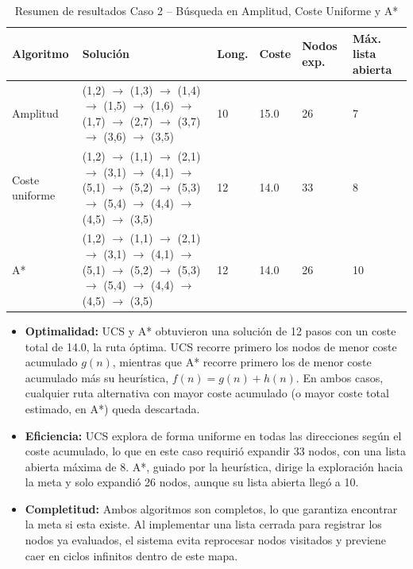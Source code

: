 \documentclass[12pt,a4paper]{article}
\begin{document}
\begin{table}[H]
\centering
\small
\begin{tabularx}{\textwidth}{|>{\raggedright\arraybackslash}p{2.0cm}|>{\raggedright\arraybackslash}X|C{1.1cm}|C{1.1cm}|C{1.3cm}|C{1.5cm}|}
\hline
\textbf{Algoritmo} & \textbf{Solución} & \textbf{Long.} & \textbf{Coste} & \textbf{Nodos exp.} & \textbf{Máx. lista abierta} \\ \hline
Amplitud & (1,2) $\rightarrow$ (1,3) $\rightarrow$ (1,4) $\rightarrow$ (1,5) $\rightarrow$ (1,6) $\rightarrow$ (1,7) $\rightarrow$ (2,7) $\rightarrow$ (3,7) $\rightarrow$ (3,6) $\rightarrow$ (3,5) & 10 & 15.0 & 26 & 7 \\ \hline
Coste uniforme & (1,2) $\rightarrow$ (1,1) $\rightarrow$ (2,1) $\rightarrow$ (3,1) $\rightarrow$ (4,1) $\rightarrow$ (5,1) $\rightarrow$ (5,2) $\rightarrow$ (5,3) $\rightarrow$ (5,4) $\rightarrow$ (4,4) $\rightarrow$ (4,5) $\rightarrow$ (3,5) & 12 & 14.0 & 33 & 8 \\ \hline
A* & (1,2) $\rightarrow$ (1,1) $\rightarrow$ (2,1) $\rightarrow$ (3,1) $\rightarrow$ (4,1) $\rightarrow$ (5,1) $\rightarrow$ (5,2) $\rightarrow$ (5,3) $\rightarrow$ (5,4) $\rightarrow$ (4,4) $\rightarrow$ (4,5) $\rightarrow$ (3,5) & 12 & 14.0 & 26 & 10 \\ \hline
\end{tabularx}
\caption{Resumen de resultados Caso 2 -- Búsqueda en Amplitud, Coste Uniforme y A*}
\label{tab:resultados_caso2}
\end{table}

\begin{itemize}
    \item \textbf{Optimalidad:} UCS y A* obtuvieron una solución de 12 pasos con un coste total de 14.0, la ruta óptima. UCS recorre primero los nodos de menor coste acumulado $g(n)$, mientras que A* recorre primero los de menor coste acumulado más su heurística, $f(n) = g(n) + h(n)$. En ambos casos, cualquier ruta alternativa con mayor coste acumulado (o mayor coste total estimado, en A*) queda descartada. 
    \item \textbf{Eficiencia:} UCS explora de forma uniforme en todas las direcciones según el coste acumulado, lo que en este caso requirió expandir 33 nodos, con una lista abierta máxima de 8. A*, guiado por la heurística, dirige la exploración hacia la meta y solo expandió 26 nodos, aunque su lista abierta llegó a 10.
    \item \textbf{Completitud:} Ambos algoritmos son completos, lo que garantiza encontrar la meta si esta existe. Al implementar una lista cerrada para registrar los nodos ya evaluados, el sistema evita reprocesar nodos visitados y previene caer en ciclos infinitos dentro de este mapa.
\end{itemize}
\end{document}
